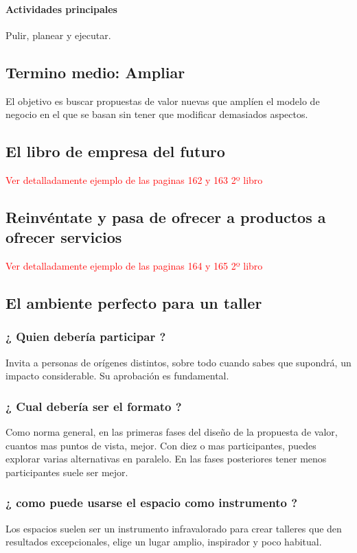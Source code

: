 \documentclass[11pt]{book}
\begin{document}
\paragraph{Actividades principales}
Pulir, planear y ejecutar.

\subsection{Termino medio: Ampliar}
El objetivo es buscar propuestas de valor nuevas que amplíen el modelo de negocio en el que se basan sin tener que modificar demasiados aspectos.

\subsection{El libro de empresa del futuro} \textcolor{red}{Ver detalladamente ejemplo de las paginas 162 y 163 2º libro}
\subsection{Reinvéntate y pasa de ofrecer a productos a ofrecer servicios}
\textcolor{red}{Ver detalladamente ejemplo de las paginas 164 y 165 2º libro}
\subsection{El ambiente perfecto para un taller}
\subsubsection{¿ Quien debería participar ?}
Invita a personas de orígenes distintos, sobre todo cuando sabes que supondrá, un impacto considerable. Su aprobación es fundamental.
\subsubsection{¿ Cual debería ser el formato ?}
Como norma general, en las primeras fases del diseño de la propuesta de valor, cuantos mas puntos de vista, mejor. Con diez o mas participantes, puedes explorar varias alternativas en paralelo. En las fases posteriores tener menos participantes suele ser mejor.
\subsubsection{¿ como puede usarse el espacio como instrumento ?}
Los espacios suelen ser un instrumento infravalorado para crear talleres que den resultados excepcionales, elige un lugar amplio, inspirador y poco habitual.
\end{document}
